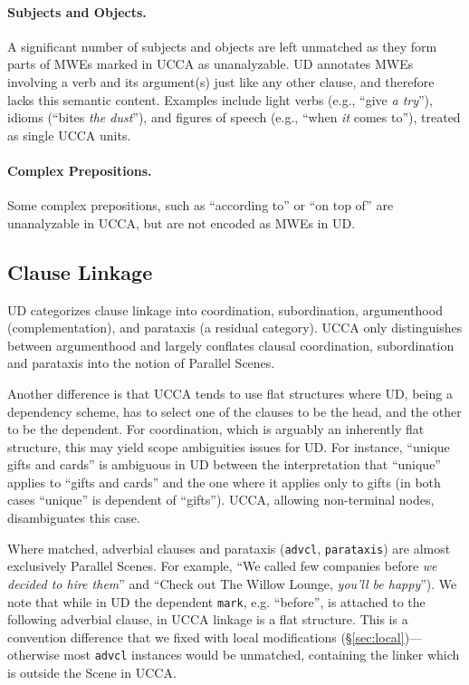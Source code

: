 \documentclass[11pt,a4paper]{article}
\begin{document}
\paragraph{Subjects and Objects.}
      A significant number of subjects and objects are left unmatched as they
      form parts of MWEs marked in UCCA as unanalyzable. UD annotates
      MWEs involving a verb and its argument(s) just like any other clause, and therefore
      lacks this semantic content. Examples include light verbs (e.g., ``give {\it a try}''),
      idioms (``bites {\it the dust}''), and figures of speech (e.g., ``when \textit{it} comes to''),
      treated as single UCCA units.
      
\paragraph{Complex Prepositions.} Some complex prepositions, such as ``according to'' or ``on top of''
      are unanalyzable in UCCA, but are not encoded as MWEs in UD.


\subsection{Clause Linkage}\label{sec:linkage}

UD categorizes clause linkage into coordination,
subordination, argumenthood (complementation),
and parataxis (a residual category).
UCCA only distinguishes between argumenthood 
and largely conflates clausal coordination, subordination and parataxis into the notion
of Parallel Scenes.

Another difference is that UCCA tends to use flat structures where UD, being a dependency scheme,
has to select one of the clauses to be the head, and the other to be the dependent. For coordination,
which is arguably an inherently flat structure, this may yield scope ambiguities issues for UD. 
For instance, ``unique gifts and cards'' is ambiguous in UD between the interpretation 
that ``unique'' applies to ``gifts and cards'' and the one where it applies only to gifts (in both
cases ``unique'' is dependent of ``gifts''). UCCA, allowing non-terminal nodes, disambiguates
this case.

Where matched, adverbial clauses and parataxis (\texttt{advcl}, \texttt{parataxis})
are almost exclusively Parallel Scenes.
For example, ``We called few companies before \textit{we decided to hire them}''
and ``Check out The Willow Lounge, \textit{you'll be happy}'').
We note that while in UD the dependent \texttt{mark}, e.g. ``before'',
is attached to the following adverbial clause,
in UCCA linkage is a flat structure.
This is a convention difference that we fixed with local modifications
(\S\ref{sec:local})---otherwise most \texttt{advcl} instances would be unmatched,
containing the linker which is outside the Scene in UCCA.
\end{document}
